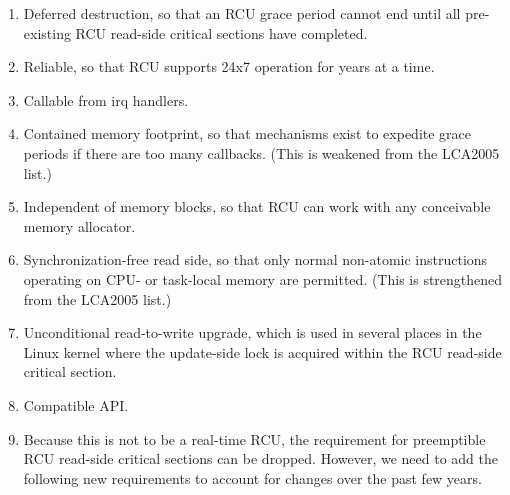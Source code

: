 \begin{enumerate}
\item	Deferred destruction, so that an RCU grace period cannot end
	until all pre-existing RCU read-side critical sections have
	completed.
\item	Reliable, so that RCU supports 24x7 operation for years at
	a time.
\item	Callable from irq handlers.
\item	Contained memory footprint, so that mechanisms exist to expedite
	grace periods if there are too many callbacks.  (This is weakened
	from the LCA2005 list.)
\item	Independent of memory blocks, so that RCU can work with any
	conceivable memory allocator.
\item	Synchronization-free read side, so that only normal non-atomic
	instructions operating on CPU- or task-local memory are permitted.
	(This is strengthened from the LCA2005 list.)
\item	Unconditional read-to-write upgrade, which is used in several
	places in the Linux kernel where the update-side lock is
	acquired within the RCU read-side critical section.
\item	Compatible API.

\item	Because this is not to be a real-time RCU, the requirement for
	preemptible RCU read-side critical sections can be dropped.
	However, we need to add the following new requirements to account
	for changes over the past few years.


\end{enumerate}
